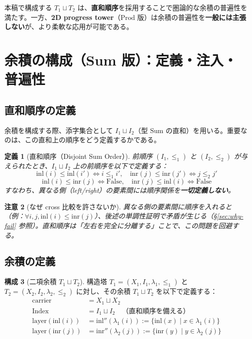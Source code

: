 \documentclass[a4paper,12pt]{ltjsarticle}
\newtheorem{definition}{定義}[section]
\newtheorem{remark}[definition]{注意}
\theoremstyle{definition}
\newtheorem{construction}[definition]{構成}
\begin{document}
\begin{tcolorbox}[title=重要な注意]
本稿で構成する $T_1 \sqcup T_2$ は、\textbf{直和順序}を採用することで圏論的な余積の普遍性を満たす。一方、\textbf{2D progress tower}（$\mathrm{Prod}$ 版）は余積の普遍性を\textbf{一般には主張しない}が、より柔軟な応用が可能である。
\end{tcolorbox}

\section{余積の構成（Sum 版）：定義・注入・普遍性}

\subsection{直和順序の定義}

余積を構成する際、添字集合として $I_1 \sqcup I_2$（型 $\mathrm{Sum}$ の直和）を用いる。重要なのは、この直和上の順序をどう定義するかである。

\begin{definition}[直和順序（Disjoint Sum Order）]
前順序 $(I_1, \leq_1)$ と $(I_2, \leq_2)$ が与えられたとき、$I_1 \sqcup I_2$ 上の前順序を以下で定義する：
\[
\mathrm{inl}(i) \leq \mathrm{inl}(i') \iff i \leq_1 i', \quad
\mathrm{inr}(j) \leq \mathrm{inr}(j') \iff j \leq_2 j'
\]
\[
\mathrm{inl}(i) \leq \mathrm{inr}(j) \iff \mathrm{False}, \quad
\mathrm{inr}(j) \leq \mathrm{inl}(i) \iff \mathrm{False}
\]
すなわち、異なる側（left/right）の要素間には順序関係を\textbf{一切定義しない}。
\end{definition}

\begin{remark}[なぜ cross 比較を許さないか]
異なる側の要素間に順序を入れると（例：$\forall i, j, \mathrm{inl}(i) \leq \mathrm{inr}(j)$）、後述の単調性証明で矛盾が生じる（\S\ref{sec:why-fail} 参照）。直和順序は「左右を完全に分離する」ことで、この問題を回避する。
\end{remark}

\subsection{余積の定義}

\begin{construction}[二項余積 $T_1 \sqcup T_2$]
構造塔 $T_1 = (X_1, I_1, \lambda_1, \leq_1)$ と $T_2 = (X_2, I_2, \lambda_2, \leq_2)$ に対し、その余積 $T_1 \sqcup T_2$ を以下で定義する：
\begin{align*}
    \text{carrier} &= X_1 \sqcup X_2 \\
    \text{Index} &= I_1 \sqcup I_2 \quad \text{（直和順序を備える）} \\
    \text{layer}(\mathrm{inl}(i)) &= \mathrm{inl}''(\lambda_1(i)) := \{\mathrm{inl}(x) \mid x \in \lambda_1(i)\} \\
    \text{layer}(\mathrm{inr}(j)) &= \mathrm{inr}''(\lambda_2(j)) := \{\mathrm{inr}(y) \mid y \in \lambda_2(j)\}
\end{align*}
\end{construction}
\end{document}
